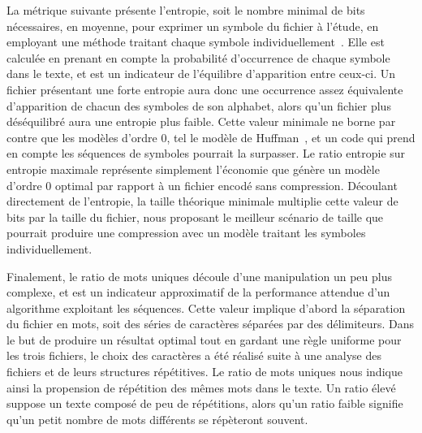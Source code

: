 \documentclass[12pt,letterpaper]{article}
\begin{document}
La métrique suivante présente l'entropie, soit le nombre minimal de bits nécessaires, en moyenne, pour exprimer un symbole du fichier à l'étude, en employant une méthode traitant chaque symbole individuellement~\cite{shannon1948}.
Elle est calculée en prenant en compte la probabilité d'occurrence de chaque symbole dans le texte, et est un indicateur de l'équilibre d'apparition entre ceux-ci.
Un fichier présentant une forte entropie aura donc une occurrence assez équivalente d'apparition de chacun des symboles de son alphabet, alors qu'un fichier plus déséquilibré aura une entropie plus faible.
Cette valeur minimale ne borne par contre que les modèles d'ordre 0, tel le modèle de Huffman~\cite{huffman1952}, et un code qui prend en compte les séquences de symboles pourrait la surpasser.
Le ratio entropie sur entropie maximale représente simplement l'économie que génère un modèle d'ordre 0 optimal par rapport à un fichier encodé sans compression.
Découlant directement de l'entropie, la taille théorique minimale multiplie cette valeur de bits par la taille du fichier, nous proposant le meilleur scénario de taille que pourrait produire une compression avec un modèle traitant les symboles individuellement.

Finalement, le ratio de mots uniques découle d'une manipulation un peu plus complexe, et est un indicateur approximatif de la performance attendue d'un algorithme exploitant les séquences.
Cette valeur implique d'abord la séparation du fichier en mots, soit des séries de caractères séparées par des délimiteurs. 
Dans le but de produire un résultat optimal tout en gardant une règle uniforme pour les trois fichiers, le choix des caractères a été réalisé suite à une analyse des fichiers et de leurs structures répétitives. 
Le ratio de mots uniques nous indique ainsi la propension de répétition des mêmes mots dans le texte.
Un ratio élevé suppose un texte composé de peu de répétitions, alors qu'un ratio faible signifie qu'un petit nombre de mots différents se répèteront souvent.

\begin{table}[htbp]
    \centering
    \caption{Mesures quantitatives des trois fichiers analysés.}
    \label{tab:analyse_q1}
\end{table}
\end{document}
